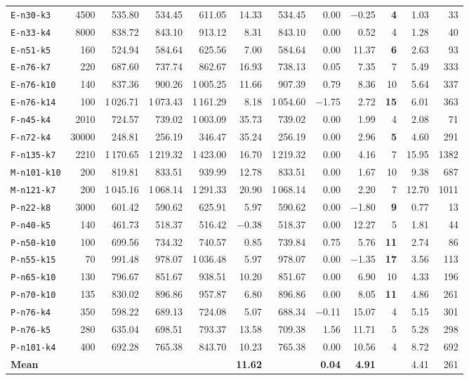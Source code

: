 \documentclass[10pt,a4paper]{article}
\begin{document}
\begin{table}[!t]
\begin{tabular}{@{}lrrrrrrrrrrr@{}}
\texttt{E-n30-k3} & 4500 & 535.80 & 534.45 & 611.05 & 14.33 & 534.45 & 0.00 & $-$0.25 & \textbf{4} & 1.03 & 33 \\
\texttt{E-n33-k4} & 8000 & 838.72 & 843.10 & 913.12 & 8.31 & 843.10 & 0.00 & 0.52 & 4 & 1.28 & 40 \\
\texttt{E-n51-k5} & 160 & 524.94 & 584.64 & 625.56 & 7.00 & 584.64 & 0.00 & 11.37 & \textbf{6} & 2.63 & 93 \\
\texttt{E-n76-k7} & 220 & 687.60 & 737.74 & 862.67 & 16.93 & 738.13 & 0.05 & 7.35 & 7 & 5.49 & 333 \\
\texttt{E-n76-k10} & 140 & 837.36 & 900.26 & 1\,005.25 & 11.66 & 907.39 & 0.79 & 8.36 & 10 & 5.64 & 337 \\
\texttt{E-n76-k14} & 100 & 1\,026.71 & 1\,073.43 & 1\,161.29 & 8.18 & 1\,054.60 & $-$1.75 & 2.72 & \textbf{15} & 6.01 & 363 \\
\texttt{F-n45-k4} & 2010 & 724.57 & 739.02 & 1\,003.09 & 35.73 & 739.02 & 0.00 & 1.99 & 4 & 2.08 & 71 \\
\texttt{F-n72-k4} & 30000 & 248.81 & 256.19 & 346.47 & 35.24 & 256.19 & 0.00 & 2.96 & \textbf{5} & 4.60 & 291 \\
\texttt{F-n135-k7} & 2210 & 1\,170.65 & 1\,219.32 & 1\,423.00 & 16.70 & 1\,219.32 & 0.00 & 4.16 & 7 & 15.95 & 1382 \\
\texttt{M-n101-k10} & 200 & 819.81 & 833.51 & 939.99 & 12.78 & 833.51 & 0.00 & 1.67 & 10 & 9.38 & 687 \\
\texttt{M-n121-k7} & 200 & 1\,045.16 & 1\,068.14 & 1\,291.33 & 20.90 & 1\,068.14 & 0.00 & 2.20 & 7 & 12.70 & 1011 \\
\texttt{P-n22-k8} & 3000 & 601.42 & 590.62 & 625.91 & 5.97 & 590.62 & 0.00 & $-$1.80 & \textbf{9} & 0.77 & 13 \\
\texttt{P-n40-k5} & 140 & 461.73 & 518.37 & 516.42 & $-$0.38 & 518.37 & 0.00 & 12.27 & 5 & 1.81 & 44 \\
\texttt{P-n50-k10} & 100 & 699.56 & 734.32 & 740.57 & 0.85 & 739.84 & 0.75 & 5.76 & \textbf{11} & 2.74 & 86 \\
\texttt{P-n55-k15} & 70 & 991.48 & 978.07 & 1\,036.48 & 5.97 & 978.07 & 0.00 & $-$1.35 & \textbf{17} & 3.56 & 113 \\
\texttt{P-n65-k10} & 130 & 796.67 & 851.67 & 938.51 & 10.20 & 851.67 & 0.00 & 6.90 & 10 & 4.33 & 196 \\
\texttt{P-n70-k10} & 135 & 830.02 & 896.86 & 957.87 & 6.80 & 896.86 & 0.00 & 8.05 & \textbf{11} & 4.86 & 261 \\
\texttt{P-n76-k4} & 350 & 598.22 & 689.13 & 724.08 & 5.07 & 688.34 & $-$0.11 & 15.07 & 4 & 5.15 & 301 \\
\texttt{P-n76-k5} & 280 & 635.04 & 698.51 & 793.37 & 13.58 & 709.38 & 1.56 & 11.71 & 5 & 5.28 & 298 \\
\texttt{P-n101-k4} & 400 & 692.28 & 765.38 & 843.70 & 10.23 & 765.38 & 0.00 & 10.56 & 4 & 8.72 & 692 \\
\midrule
\textbf{Mean} & & & & & \textbf{11.62} & & \textbf{0.04} & \textbf{4.91} & & 4.41 & 261 \\
\bottomrule
\end{tabular}
\end{table}
\end{document}
